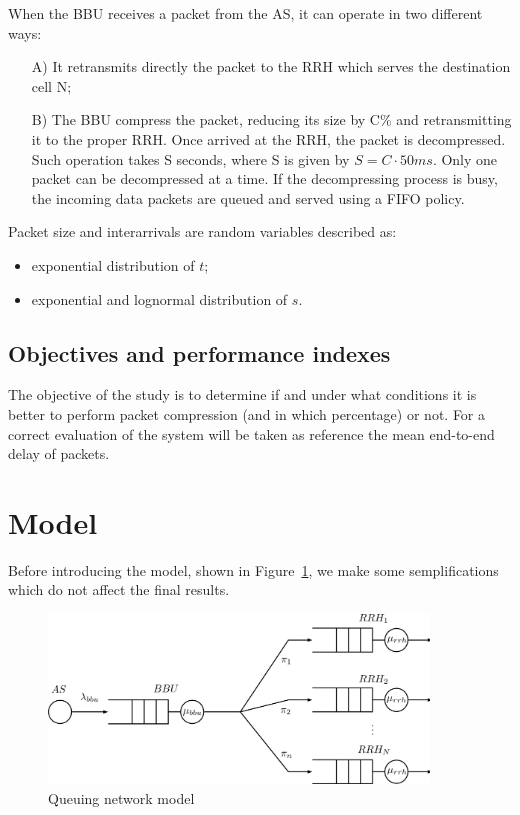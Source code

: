 \documentclass[11pt,a4paper,oneside, openright]{article}
\begin{document}
When the BBU receives a packet from the AS, it can operate in two different ways:
\begin{itemize}
	\item[A)]It retransmits directly the packet to the RRH which serves the destination cell N;
	\item[B)]The BBU compress the packet, reducing its size by C\% and retransmitting it to the proper RRH. Once arrived at the RRH, the packet is decompressed. Such operation takes S seconds, where S is given by $ S = C \cdot 50ms $. Only one packet can be decompressed at a time. If the decompressing process is busy, the incoming data packets are queued and served using a FIFO policy.
\end{itemize}

Packet size and interarrivals are random variables described as:
\begin{itemize}
	\item exponential distribution of $t$;
	\item exponential and lognormal distribution of $s$.
\end{itemize}

\subsection{Objectives and performance indexes}
The objective of the study is to determine if and under what conditions it is better to perform packet compression (and in which percentage) or not.
For a correct evaluation of the system will be taken as reference the mean end-to-end delay of packets.

\section{Model}
Before introducing the model, shown in Figure~\ref{fig:model}, we make some semplifications which do not affect the final results.

\begin{figure}[h]
	\centering
	\includegraphics[width=0.9\textwidth]{images/model}
	\caption{Queuing network model}
	\label{fig:model}
\end{figure}
\end{document}
